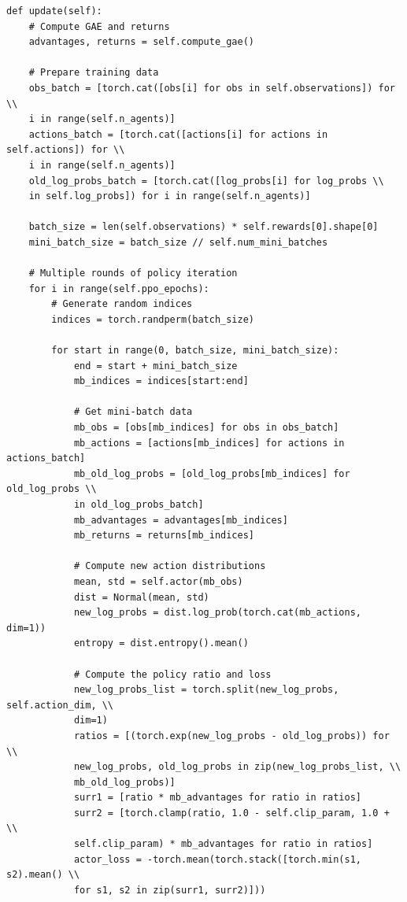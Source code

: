 \documentclass[12pt]{article}
\begin{document}
\begin{verbatim}
def update(self):
    # Compute GAE and returns
    advantages, returns = self.compute_gae()
    
    # Prepare training data
    obs_batch = [torch.cat([obs[i] for obs in self.observations]) for \\
    i in range(self.n_agents)]
    actions_batch = [torch.cat([actions[i] for actions in self.actions]) for \\
    i in range(self.n_agents)]
    old_log_probs_batch = [torch.cat([log_probs[i] for log_probs \\
    in self.log_probs]) for i in range(self.n_agents)]
    
    batch_size = len(self.observations) * self.rewards[0].shape[0]
    mini_batch_size = batch_size // self.num_mini_batches
    
    # Multiple rounds of policy iteration
    for i in range(self.ppo_epochs):
        # Generate random indices
        indices = torch.randperm(batch_size)
        
        for start in range(0, batch_size, mini_batch_size):
            end = start + mini_batch_size
            mb_indices = indices[start:end]
            
            # Get mini-batch data
            mb_obs = [obs[mb_indices] for obs in obs_batch]
            mb_actions = [actions[mb_indices] for actions in actions_batch]
            mb_old_log_probs = [old_log_probs[mb_indices] for old_log_probs \\
            in old_log_probs_batch]
            mb_advantages = advantages[mb_indices]
            mb_returns = returns[mb_indices]
            
            # Compute new action distributions
            mean, std = self.actor(mb_obs)
            dist = Normal(mean, std)
            new_log_probs = dist.log_prob(torch.cat(mb_actions, dim=1))
            entropy = dist.entropy().mean()
            
            # Compute the policy ratio and loss
            new_log_probs_list = torch.split(new_log_probs, self.action_dim, \\
            dim=1)
            ratios = [(torch.exp(new_log_probs - old_log_probs)) for \\
            new_log_probs, old_log_probs in zip(new_log_probs_list, \\
            mb_old_log_probs)]
            surr1 = [ratio * mb_advantages for ratio in ratios]
            surr2 = [torch.clamp(ratio, 1.0 - self.clip_param, 1.0 + \\
            self.clip_param) * mb_advantages for ratio in ratios]
            actor_loss = -torch.mean(torch.stack([torch.min(s1, s2).mean() \\
            for s1, s2 in zip(surr1, surr2)]))
            

\end{verbatim}
\end{document}
